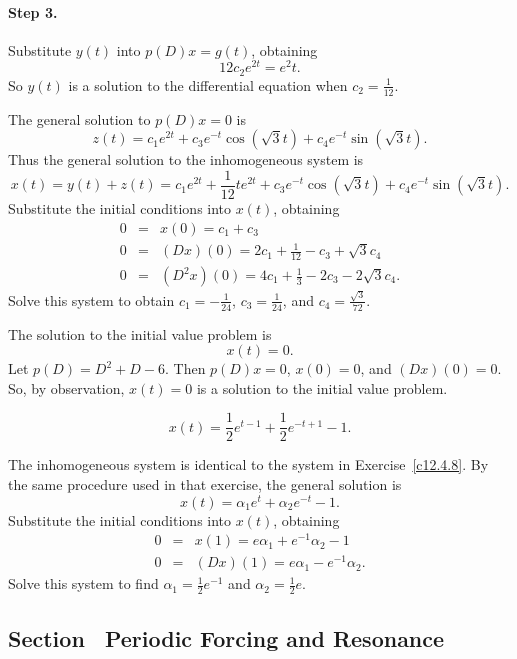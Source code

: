 \paragraph{Step 3.} Substitute $y(t)$ into $p(D)x = g(t)$, obtaining
\[
12c_2e^{2t} = e^2t.
\]
So $y(t)$ is a solution to the differential equation when $c_2 = \frac{1}{12}$.

\para The general solution to $p(D)x = 0$ is
\[
z(t) = c_1e^{2t} + c_3e^{-t}\cos(\sqrt{3}t) + c_4e^{-t}\sin(\sqrt{3}t).
\]
Thus the general solution to the inhomogeneous system is
\[
x(t) = y(t) + z(t) = c_1e^{2t} + \frac{1}{12}te^{2t}
+ c_3e^{-t}\cos(\sqrt{3}t) + c_4e^{-t}\sin(\sqrt{3}t).
\]
Substitute the initial conditions into $x(t)$, obtaining
\[
\begin{array}{rcl}
0 & = & x(0) = c_1 + c_3 \\
0 & = & (Dx)(0) = 2c_1 + \frac{1}{12} - c_3 + \sqrt{3}c_4 \\
0 & = & (D^2x)(0) = 4c_1 + \frac{1}{3} - 2c_3 - 2\sqrt{3}c_4.
\end{array}
\]
Solve this system to obtain $c_1 = -\frac{1}{24}$, $c_3 = \frac{1}{24}$,
and $c_4 = \frac{\sqrt{3}}{72}$.

 \ans The solution to the initial value problem is
\[
x(t) = 0.
\]
\soln Let $p(D) = D^2 + D - 6$.  Then $p(D)x = 0$, $x(0) = 0$, and
$(Dx)(0) = 0$.  So, by observation, $x(t) = 0$ is a solution to the
initial value problem.


 \ans
\[
x(t) = \frac{1}{2}e^{t - 1} + \frac{1}{2}e^{-t + 1} - 1.
\]

\soln The inhomogeneous system is identical to the system in
Exercise~\ref{c12.4.8}.  By the same procedure used in that exercise,
the general solution is
\[
x(t) = \alpha_1e^t + \alpha_2e^{-t} - 1.
\]
Substitute the initial conditions into $x(t)$, obtaining
\[
\begin{array}{rcl}
0 & = & x(1) = e\alpha_1 + e^{-1}\alpha_2 - 1 \\
0 & = & (Dx)(1) = e\alpha_1 - e^{-1}\alpha_2.
\end{array}
\]
Solve this system to find $\alpha_1 = \frac{1}{2}e^{-1}$ and
$\alpha_2 = \frac{1}{2}e$.



\subsection*{Section~\protect{\ref{S:resonance}} Periodic Forcing and Resonance}

